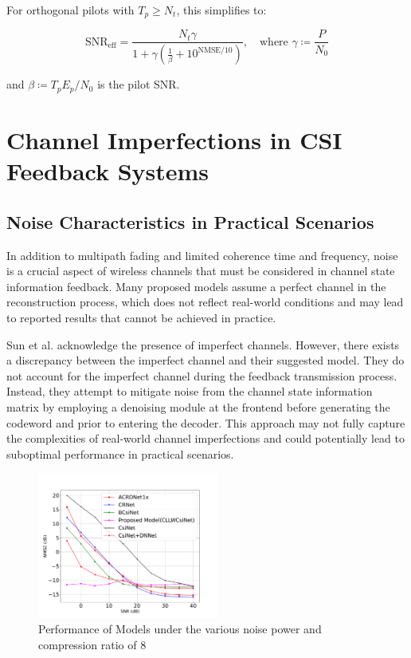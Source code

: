 \documentclass[lettersize,journal]{IEEEtran}
\begin{document}
For orthogonal pilots with $T_p \geq N_t$, this simplifies to:

\begin{equation}
\text{SNR}_{\text{eff}} = \frac{N_t \gamma}{1 + \gamma\left(\frac{1}{\beta} + 10^{\text{NMSE}/10}\right)}, \quad \text{where } \gamma \coloneqq \frac{P}{N_0}
\end{equation}

\noindent and $\beta \coloneqq T_p E_p/N_0$ is the pilot SNR. 

\section{Channel Imperfections in CSI Feedback Systems}
\subsection{Noise Characteristics in Practical Scenarios}
In addition to multipath fading and limited coherence time and frequency, noise is a crucial aspect of wireless channels that must be considered in channel state information feedback. Many proposed models assume a perfect channel in the reconstruction process, which does not reflect real-world conditions and may lead to reported results that cannot be achieved in practice.

Sun et al. \cite{bbb1} acknowledge the presence of imperfect channels. However, there exists a discrepancy between the imperfect channel and their suggested model. They do not account for the imperfect channel during the feedback transmission process. Instead, they attempt to mitigate noise from the channel state information matrix by employing a denoising module at the frontend before generating the codeword and prior to entering the decoder. This approach may not fully capture the complexities of real-world channel imperfections and could potentially lead to suboptimal performance in practical scenarios.
\begin{figure}
	\centering
	\includegraphics[width=0.53\textwidth]{Figure_1.pdf}
	\caption{Performance of Models under the various noise power and compression ratio of 8}
	\label{fig:Performance of Models under the various noise power}
\end{figure}
\end{document}
